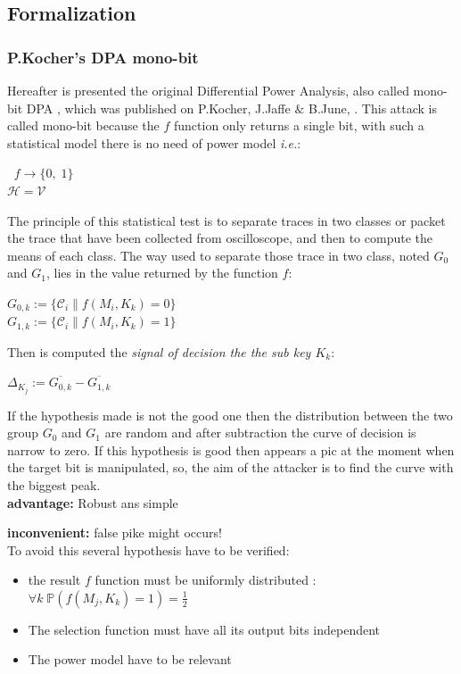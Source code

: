 \newpage
\subsection{Formalization}

\subsubsection{P.Kocher's DPA mono-bit}
Hereafter is presented the original Differential Power Analysis, also called mono-bit DPA ,
which was published on P.Kocher, J.Jaffe $\&$ B.June, . 
This attack is called mono-bit because the $ f $ function only returns a single bit,
with such a statistical model there is no  need of power model
\textit{i.e.}: 
\begin{center}
$ \;\; f \longrightarrow  \{0,\;1\}$ \\

\vspace{1mm}
$\mathcal{H}=\mathcal{V}$
\end{center}

The principle of this statistical test is to separate traces in two classes or packet
the trace that have been collected from oscilloscope, and then to compute the means of each class.
The way used to separate those trace in two class, noted $G_0$ and  $G_1$, 
lies in the value returned by the function $f$:
\begin{center}
$G_{0,k} := \{\mathcal{C}_i  \| f(M_i,K_k)=0 \} $\\
$G_{1,k} := \{\mathcal{C}_i  \| f(M_i,K_k)=1 \} $
\end{center}
Then is computed the \textit{signal of decision the the sub key $ K_k $}:
\begin{center}
$ \Delta_{K_j}  := \overline{G_{0,k}}-  \overline{G_{1,k}}$
\end{center}

If the hypothesis made is not the good one then the distribution between the two group $G_0$ and $G_1$ are
random and after subtraction the curve of decision  is narrow to zero.
If this hypothesis is good then appears a pic at the moment when the target bit is manipulated, so,
the aim of the attacker is to find the curve with the biggest peak. 
\hspace{3mm}\\

\textbf{advantage:} Robust ans simple

\textbf{inconvenient:} false pike might occurs!\\ 
To avoid this several hypothesis have to be verified:
\begin{itemize}
	\item	the result $ f $ function must be uniformly distributed : 
$\forall k\; \mathbb{P}(f(M_j, K_k)=1) = \frac{1}{2}$
	\item The selection function must have all its output bits independent
	\item The power model have to be relevant 
\end{itemize}

